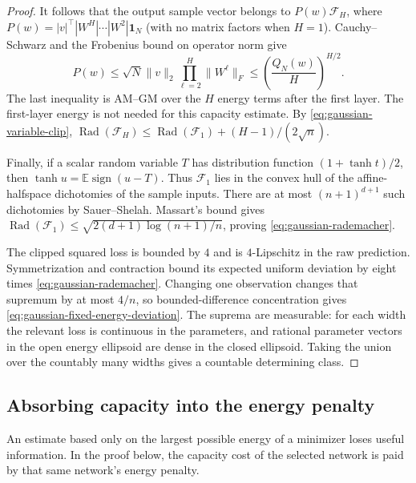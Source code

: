 \begin{proof}
It follows that the output sample vector belongs to
$P(w)\mathcal F_H$, where
$P(w)=|v|^\top|W^H|\cdots|W^2|\boldsymbol1_N$ (with no matrix factors
when $H=1$).  Cauchy--Schwarz and the Frobenius bound on operator norm give
\[
 P(w)\leq\sqrt N\|v\|_2\prod_{\ell=2}^H\|W^\ell\|_F
 \leq\left(\frac{Q_N(w)}H\right)^{H/2}.
\]
The last inequality is AM--GM over the $H$ energy terms after the first
layer.  The first-layer energy is not needed for this capacity estimate.
By \eqref{eq:gaussian-variable-clip},
$\operatorname{Rad}(\mathcal F_H)\leq
\operatorname{Rad}(\mathcal F_1)+(H-1)/(2\sqrt n)$.

Finally, if a scalar random variable $T$ has distribution function
$(1+\tanh t)/2$, then $\tanh u=\mathbb E\operatorname{sign}(u-T)$.
Thus $\mathcal F_1$ lies in the convex hull of the affine-halfspace
dichotomies of the sample inputs.  There are at most $(n+1)^{d+1}$ such
dichotomies by Sauer--Shelah.  Massart's bound gives
$\operatorname{Rad}(\mathcal F_1)
\leq\sqrt{2(d+1)\log(n+1)/n}$, proving
\eqref{eq:gaussian-rademacher}.

The clipped squared loss is bounded by $4$ and is $4$-Lipschitz in the
raw prediction.  Symmetrization and contraction bound its expected
uniform deviation by eight times
\eqref{eq:gaussian-rademacher}.  Changing one observation changes that
supremum by at most $4/n$, so bounded-difference concentration gives
\eqref{eq:gaussian-fixed-energy-deviation}.
The suprema are measurable: for each width the relevant loss is
continuous in the parameters, and rational parameter vectors in the
open energy ellipsoid are dense in the closed ellipsoid.  Taking the
union over the countably many widths gives a countable determining
class.
\end{proof}

\subsection{Absorbing capacity into the energy penalty}

An estimate based only on the largest possible energy of a minimizer
loses useful information.  In the proof below, the capacity cost of
the selected network is paid by that same network's energy penalty.

